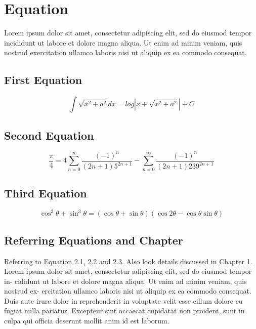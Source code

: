 


\chapter{Equation}
Lorem ipsum dolor sit amet, consectetur adipiscing elit, sed do eiusmod tempor incididunt
ut labore et dolore magna aliqua. Ut enim ad minim veniam, quis nostrud exercitation
ullamco laboris nisi ut aliquip ex ea commodo consequat. 
\section{First Equation}
\begin{equation}
    \int \sqrt{ x^2 + a^2  } dx =  log | x+ \sqrt{ x^2 + a^2 } | + C
\end{equation}

\section{Second Equation}
\begin{equation}
    \frac{\pi}{4} = 4 \sum\limits_{n=0}^\infty \frac{(-1)^n}{(2n+1)5^{2n+1}}  -	\sum\limits_{n=0}^\infty \frac{(-1)^n}{(2n+1)239^{2n+1}} 
\end{equation}

\section{Third Equation}
\begin{equation}
    \cos^ 3 {\theta} + \sin^ 3 {\theta} = (\cos {\theta} + \sin {\theta})(\cos {2\theta} - \cos{\theta}\sin{\theta})
\end{equation}

\section{Referring Equations and Chapter}
Referring to Equation 2.1, 2.2 and 2.3. Also look details discussed in Chapter 1.
Lorem ipsum dolor sit amet, consectetur adipiscing elit, sed do eiusmod tempor in-
cididunt ut labore et dolore magna aliqua. Ut enim ad minim veniam, quis nostrud ex-
ercitation ullamco laboris nisi ut aliquip ex ea commodo consequat. Duis aute irure dolor
in reprehenderit in voluptate velit esse cillum dolore eu fugiat nulla pariatur. Excepteur
sint occaecat cupidatat non proident, sunt in culpa qui officia deserunt mollit anim id est
laborum.
